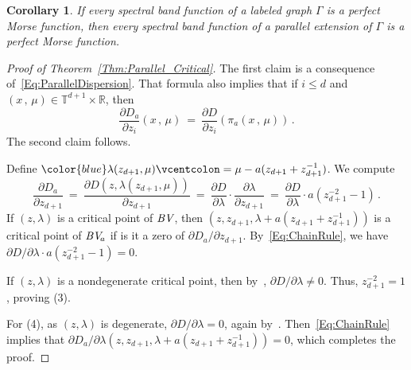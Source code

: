 \documentclass[12pt]{amsart}
\newtheorem{Corollary}[Theorem]{Corollary}
\theoremstyle{remark}
\newcommand{\RR}{{\mathbb R}}
\newcommand{\TT}{{\mathbb T}}
\newcommand{\BV}{{\textit{BV}}\hspace{0.5pt}}
\newcommand{\defcolor}[1]{{\color{blue}#1}}
\begin{document}
\begin{Corollary}
  If every spectral band function of a labeled graph $\Gamma$ is a perfect Morse function,
  then every spectral band function of a parallel extension of\/ $\Gamma$ is a perfect Morse function.
\end{Corollary}
\begin{proof}[Proof of Theorem~\ref{Thm:Parallel_Critical}]
  The first claim is a  consequence of~\eqref{Eq:ParallelDispersion}.
  That formula also implies that if  $i\leq d$ and $(x\,,\,\mu)\in\TT^{d+1}\times\RR$, then
  \[
    \frac{\partial D_a}{\partial z_i}(x\,,\,\mu)\ =\
    \frac{\partial D}{\partial z_i}(\pi_a(x\,,\,\mu))\,.
  \]
  The second claim follows.

  Define $\defcolor{\lambda(z_{d+1},\mu)}\vcentcolon= \mu-a(z_{d+1}+z_{d+1}^{-1})$.
  We compute
  \begin{equation}\label{Eq:ChainRule}
    \frac{\partial D_a}{\partial z_{d+1}}\ =\
    \frac{\partial D(z,\lambda(z_{d+1},\mu))}{\partial z_{d+1}}\ =\
    \frac{\partial D}{\partial\lambda}\cdot \frac{\partial \lambda}{\partial z_{d+1}}\ =\ 
    \frac{\partial D}{\partial\lambda} \cdot a(z_{d+1}^{-2}-1)\,.
  \end{equation}
  If $(z,\lambda)$ is a critical point of $\BV$, then $(z,z_{d+1},\lambda+a(z_{d+1}+z_{d+1}^{-1}))$ is a critical point
  of $\BV\!_a$ if is it a zero of $\partial D_a/\partial z_{d+1}$.
  By~\eqref{Eq:ChainRule}, we have $\partial D/\partial \lambda \cdot a (z_{d+1}^{-2}-1)=0$.

  If $(z,\lambda)$ is a nondegenerate critical point, then by~\cite[Lem.\ 5.1]{FS24},
  $\partial D/\partial \lambda \neq 0$.
  Thus, $z_{d+1}^{-2}=1$, proving (3).

  For (4), as $(z,\lambda)$ is degenerate,  $\partial D/\partial \lambda= 0$, again by~\cite[Lem.\ 5.1]{FS24}.
  Then~\eqref{Eq:ChainRule} implies that   $\partial D_a/\partial \lambda(z,z_{d+1},\lambda+a(z_{d+1}+z_{d+1}^{-1}))= 0$,
  which completes the proof.
\end{proof}


%
%
\end{document}
